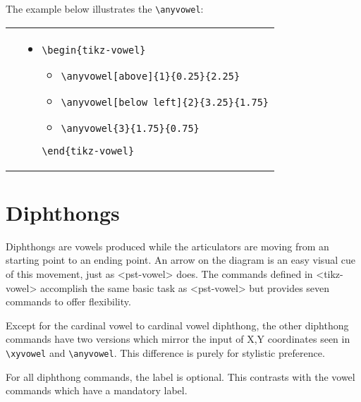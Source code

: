 \documentclass{article}
\newcommand{\pkg}[1]{\texttt{#1}}
\def\texttt#1{<#1>}%
\def\charissil{}%
\begin{document}
\bigskip
\noindent
The example below illustrates the \verb|\anyvowel|:

\begin{center}
\begin{tabular}{rl}
  \begin{minipage}[t]{0.35\textwidth}
	{\large\charissil
		{\bfseries
		\begin{tikz-vowel}
    			\anyvowel[above]{1}{0.25}{2.25}
    			\anyvowel[below left]{2}{3.25}{1.75}
   			\anyvowel{3}{1.75}{0.75}
		\end{tikz-vowel}
		}
	}
  \end{minipage} &
  \begin{minipage}[t]{0.44\textwidth}
  \vspace{-90pt}
  {\small
\begin{itemize}[label={}]
	\item \verb|\begin{tikz-vowel}|
		\begin{itemize}[label={}]
			\item \verb|\anyvowel[above]{1}{0.25}{2.25}|
			\item \verb|\anyvowel[below left]{2}{3.25}{1.75}|
			\item \verb|\anyvowel{3}{1.75}{0.75}|
		\end{itemize}
	\verb|\end{tikz-vowel}|
\end{itemize}
    }
  \end{minipage}
\end{tabular}
\end{center}

\section{Diphthongs}
\label{sec:Diphthongs}

Diphthongs are vowels produced while the articulators are moving from an starting point to an ending point.  An arrow on the diagram is an easy visual cue of this movement, just as \pkg{pst-vowel} does.  The commands defined in \pkg{tikz-vowel} accomplish the same basic task as \pkg{pst-vowel} but provides seven commands to offer flexibility.

Except for the cardinal vowel to cardinal vowel diphthong, the other diphthong commands have two versions which mirror the input of X,Y coordinates seen in \verb|\xyvowel| and \verb|\anyvowel|.  This difference is purely for stylistic preference.

For all diphthong commands, the label is optional.  This contrasts with the vowel commands which have a mandatory label.
\end{document}
